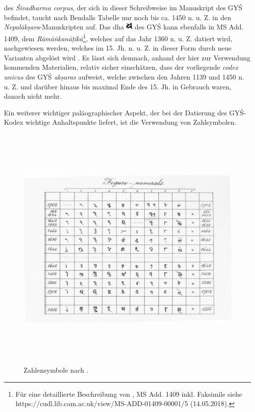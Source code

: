\documentclass[a4paper,12pt]{article}
\begin{document}
{des \textit{Śivadharma corpus}, der sich in dieser Schreibweise im Manuskript des GYŚ befindet, taucht nach Bendalls Tabelle nur noch bis ca. 1450 n. u. Z. in den \textit{Nepalākṣara}-Manuskripten auf. Das dha \includegraphics[height=4.0mm]{paleo_dh.png} des GYŚ kann ebenfalls in MS Add. 1409, dem \textit{Rāmāṅkanāṭikā}\footnote{\raggedright{Für eine detaillierte Beschreibung von \textcite{ramakantika}, MS Add. 1409 inkl. Faksimile siehe https://cudl.lib.cam.ac.uk/view/MS-ADD-01409-00001/5 (14.05.2018).}}, welches auf das Jahr 1360 n. u. Z. datiert wird, nachgewiesen werden, welches im 15. Jh. n. u. Z. in dieser Form durch neue Varianten abgelöst wird \parencite[233]{bendall1992}. Es lässt sich demnach, anhand der hier zur Verwendung kommenden Materialien, relativ sicher einschätzen, dass der vorliegende \textit{codex unicus} des GYŚ \textit{akṣaras} aufweist, welche zwischen den Jahren 1139 und 1450 n. u. Z. und darüber hinaus bis maximal Ende des 15. Jh. in Gebrauch waren, danach nicht mehr. 

Ein weiterer wichtiger paläographischer Aspekt, der bei der Datierung des GYŚ-Kodex wichtige Anhaltspunkte liefert, ist die Verwendung von Zahlsymbolen.

\begin{figure}[ht]
	\centering
  \includegraphics[width=1\textwidth, height=350pt]{bendall3.jpg}
	\caption{Zahlensymbole nach \parencite[liv]{bendall1992}.}
	\label{fig2}
\end{figure}
 
}
\end{document}
